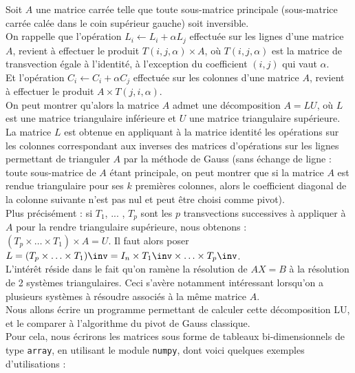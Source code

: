 Soit $A$ une matrice carrée telle que toute sous-matrice principale (sous-matrice carrée calée dans 
le coin supérieur gauche) soit inversible.\\


On rappelle que l'opération $L_i \leftarrow L_i + \alpha L_j$ effectuée sur les lignes d'une 
matrice $A$, revient à effectuer le produit $T(i,j,\alpha)\times A$, où $T(i,j,\alpha)$ est la 
matrice de transvection égale à l'identité, à l'exception du coefficient $(i,j)$ qui vaut 
$\alpha$.\\


Et l'opération $C_i \leftarrow C_i + \alpha C_j$ effectuée sur les colonnes d'une matrice $A$, 
revient à effectuer le produit $A\times T(j,i,\alpha)$.\\
On peut montrer qu'alors la matrice $A$ admet une décomposition $A = LU$, où $L$ est une matrice 
triangulaire inférieure et $U$ une matrice triangulaire supérieure. La matrice $L$ est obtenue en 
appliquant à la matrice identité les opérations sur les colonnes correspondant aux inverses des 
matrices d'opérations sur les lignes permettant de trianguler $A$ par la méthode de Gauss (sans 
échange de ligne : toute sous-matrice de $A$ étant principale, on  peut montrer que si la 
matrice $A$ est rendue triangulaire pour ses $k$ premières colonnes, alors le coefficient 
diagonal de la colonne suivante n'est pas nul et peut être choisi comme pivot).\\
Plus précisément : si $T_1$, ... , $T_p$ sont les $p$ transvections successives à appliquer à $A$ 
pour la rendre triangulaire supérieure, nous obtenons : $(T_p\times \ldots \times T_1)\times A=U$. 
Il faut alors poser $L=(T_p\times \ldots\times T_1)\inv=I_n\times T_1\inv \times \ldots\times 
T_p\inv$.\\


L'intérêt réside dans le fait qu'on ramène la résolution de $AX = B$ à la résolution de 2 systèmes 
triangulaires. Ceci s'avère notamment intéressant lorsqu'on a plusieurs systèmes à résoudre 
associés 
à la même matrice $A$.\\


Nous allons écrire un programme permettant de calculer cette décomposition LU, et le comparer à 
l'algorithme du pivot de Gauss classique.\\
Pour cela, nous écrirons les matrices sous forme de tableaux bi-dimensionnels de type 
\texttt{array}, en utilisant le module \texttt{numpy}, dont voici quelques exemples 
d'utilisations :\\


